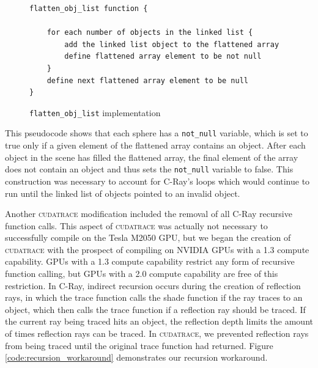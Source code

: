 \documentclass[12pt]{article}
\begin{document}
\begin{figure}
    \caption{\texttt{flatten\_obj\_list} implementation} \label{code:flatten_obj_list}
\begin{lstlisting}
flatten_obj_list function {
   
    for each number of objects in the linked list {
        add the linked list object to the flattened array
        define flattened array element to be not null
    }
    define next flattened array element to be null 
}
\end{lstlisting}
\end{figure}

This pseudocode shows that each sphere has a \texttt{not\_null} variable, which is set to true only if a given element of the flattened array contains an object. After each object in the scene has filled the flattened array, the final element of the array does not contain an object and thus sets the \texttt{not\_null} variable to false. This construction was necessary to account for C-Ray's loops which would continue to run until the linked list of objects pointed to an invalid object.

Another \textsc{cudatrace} modification included the removal of all C-Ray recursive function calls. This aspect of \textsc{cudatrace} was actually not necessary to successfully compile on the Tesla M2050 GPU, but we began the creation of \textsc{cudatrace} with the prospect of compiling on NVIDIA GPUs with a 1.3 compute capability. GPUs with a 1.3 compute capability restrict any form of recursive function calling, but GPUs with a 2.0 compute capability are free of this restriction. In C-Ray, indirect recursion occurs during the creation of reflection rays, in which the trace function calls the shade function if the ray traces to an object, which then calls the trace function if a reflection ray should be traced. If the current ray being traced hits an object, the reflection depth limits the amount of times reflection rays can be traced. In \textsc{cudatrace}, we prevented reflection rays from being traced until the original trace function had returned. Figure \ref{code:recursion_workaround} demonstrates our recursion workaround.
\end{document}
